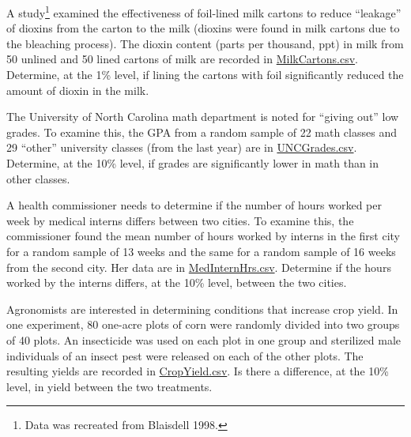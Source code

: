 \documentclass[10pt,openany]{book}\usepackage[]{graphicx}\usepackage[]{color}
\begin{document}
\newpage
\begin{exsection}
\vspace{-8pt}
  \item \label{revex:tTestMilk} \rhw{} A study\footnote{Data was recreated from Blaisdell 1998.} examined the effectiveness of foil-lined milk cartons to reduce ``leakage'' of dioxins from the carton to the milk (dioxins were found in milk cartons due to the bleaching process).  The dioxin content (parts per thousand, ppt) in milk from 50 unlined and 50 lined cartons of milk are recorded in \href{https://raw.githubusercontent.com/droglenc/NCData/master/MilkCartons.csv}{MilkCartons.csv}.  Determine, at the 1\% level, if lining the cartons with foil significantly reduced the amount of dioxin in the milk. 

  \item \label{revex:tTestMathGrades} \rhw{} The University of North Carolina math department is noted for ``giving out'' low grades.  To examine this, the GPA from a random sample of 22 math classes and 29 ``other'' university classes (from the last year) are in \href{https://raw.githubusercontent.com/droglenc/NCData/master/UNCgrades.csv}{UNCGrades.csv}. Determine, at the 10\% level, if grades are significantly lower in math than in other classes. 

  \item \label{revex:tTestMedSchool} \rhw{} A health commissioner needs to determine if the number of hours worked per week by medical interns differs between two cities.  To examine this, the commissioner found the mean number of hours worked by interns in the first city for a random sample of 13 weeks and the same for a random sample of 16 weeks from the second city.  Her data are in \href{https://sites.google.com/site/ncstats/data/MedInternHrs.csv}{MedInternHrs.csv}.  Determine if the hours worked by the interns differs, at the 10\% level, between the two cities. 

  \item \label{revex:tTestYield} \rhw{} Agronomists are interested in determining conditions that increase crop yield.  In one experiment, 80 one-acre plots of corn were randomly divided into two groups of 40 plots.  An insecticide was used on each plot in one group and sterilized male individuals of an insect pest were released on each of the other plots.  The resulting yields are recorded in \href{https://raw.githubusercontent.com/droglenc/NCData/master/CropYield.csv}{CropYield.csv}.  Is there a difference, at the 10\% level, in yield between the two treatments.  


\end{exsection}
\end{document}
